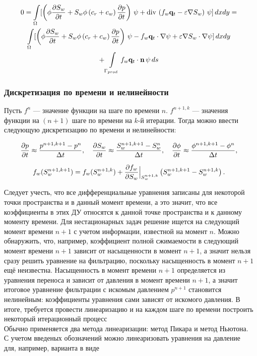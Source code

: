 \begin{multline}
	\displaystyle 0=\int\limits_\Omega  [\left(\phi \dfrac{\partial S_w}{\partial t} + S_w\phi\left(c_r + c_w \right)\dfrac{\partial p}{\partial t} \right)\,\psi + \operatorname{div}\, \left( f_w \mathbf{q}_t - \varepsilon \nabla S_w \right)\, \psi] \,dx dy = \\ 
	\int\limits_\Omega[\left(\phi \dfrac{\partial S_w}{\partial t} + S_w\phi\left(c_r + c_w \right)\dfrac{\partial p}{\partial t} \right)\,\psi -  f_w \mathbf{q}_t \cdot \nabla \psi +  \varepsilon \nabla S_w \cdot \nabla \psi] \,dx dy \\
	+\int\limits_{\Gamma_{prod}} f_w \mathbf{q}_t \cdot \mathbf{n} \,\psi \, ds
\end{multline}

\subsubsection{Дискретизация по времени и нелинейности}

Пусть $f^{n}$ --- значение функции на шаге по времени $n$. $f^{n+1,k}$ --- значения функции на $(n+1)$ шаге по времени на $k$-й итерации. Тогда можно ввести следующую дискретизацию по времени и нелинейности:

\begin{equation}
	\dfrac{\partial p}{\partial t} \approx \dfrac{p^{n+1, k+1}-p^{n}}{\Delta t}, \quad \dfrac{\partial S_w}{\partial t} \approx \dfrac{S_w^{n+1, k+1}-S_w^{n}}{\Delta t}, \quad \dfrac{\partial \phi}{\partial t} \approx \dfrac{\phi^{n+1, k+1}-\phi^{n}}{\Delta t},
\end{equation}

\begin{equation}\label{eq:BL_Taylor_expansion}
	f_w(S_w^{n+1, k+1}) = f_w(S_w^{n+1, k}) + \dfrac{\partial f_w}{\partial S_w}\Bigl|_{S_w^{n+1, k}}\Bigr. \left( S_w^{n+1, k+1} - S_w^{n+1, k} \right) .
\end{equation}

Следует учесть, что все дифференциальные уравнения записаны для некоторой точки пространства
и в данный момент времени, а это значит, что все коэффициенты в этих ДУ относятся к данной точке
пространства и к данному моменту времени. Для нестационарных задач решение ищется на следующий момент
времени $n+1$ с учетом информации, известной на момент $n$.  Можно обнаружить, что, например,
коэффициент полной сжимаемости  в следующий момент времени $n+1$ зависит от 
насыщенности в момент $n+1$, а значит 
нельзя сразу решить уравнение на фильтрацию, поскольку насыщенность в момент $n+1$ ещё неизвестна.
Насыщенность в момент времени $n+1$ определяется из уравнения переноса и зависит от давления в момент 
времени $n+1$, а значит итоговое уравнение фильтрации с искомым давлением $p^{n+1}$ становится нелинейным: 
коэффициенты уравнения сами зависят от искомого давления. В итоге, требуется провести линеаризацию и 
на каждом шаге по времени построить некоторый итерационный процесс\\
Обычно применяется два метода линеаризации: метод Пикара и метод Ньютона.
С учетом введеных обозначений можно линеаризовать уравнения на давление для, например, варианта 
 в виде

